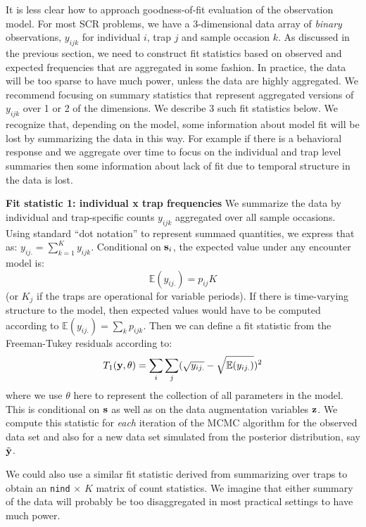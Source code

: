 It is less clear how to approach goodness-of-fit evaluation of the
observation model.  For most SCR problems, we have a 3-dimensional
data array of {\it binary} observations, $y_{ijk}$ for individual $i$,
trap $j$ and sample occasion $k$. As  discussed
in the previous section, we need to construct fit statistics based on
observed and expected frequencies that are aggregated in some fashion.
In practice, the data will be too sparse to have much power, unless
the 
data are highly aggregated. We recommend focusing on summary
statistics that represent aggregated versions of $y_{ijk}$ over 1 or 2
of the dimensions. We describe 3 such fit statistics below.  We
recognize that, depending on the model, some information about model
fit will be lost by summarizing the data in this way. For example if
there is a behavioral response and we aggregate over time to focus on
the individual and trap level summaries then some information about
lack of fit due to temporal structure in the data is lost.

{\bf Fit statistic 1: individual x trap frequencies} We summarize the
data by individual and trap-specific counts $y_{ijk}$
aggregated over
all sample occasions. Using standard ``dot notation'' to represent
summaed quantities, we express that as:
$y_{ij.} = \sum_{k=1}^{K} y_{ijk}$.
 Conditional on ${\bf s}_{i}$, the expected value
under any encounter model is:
\[
 \mathbb{E}(y_{ij.}) = p_{ij} K
\]
(or $K_{j}$ if the traps are operational for variable periods). If
there is time-varying structure to the model, then expected values
would have to be computed according to $\mathbb{E}(y_{ij.}) = \sum_{k} p_{ijk}$.
Then we can define a fit statistic from the Freeman-Tukey residuals
according to:
\[
 T_{1}({\bf y}, \theta) = \sum_{i}\sum_{j} (\sqrt{ y_{ij.} } - \sqrt{ \mathbb{E}(y_{ij.}) })^2
\]
where we use $\theta$ here to represent the collection of all
parameters in the model.  This is conditional on ${\bf s}$ as well as
on the data augmentation variables ${\bf z}$. We compute this
statistic for {\it each} iteration of the MCMC algorithm for the
observed data set and also for a new data set simulated from the posterior
distribution, say $\tilde{\bf y}$.

We could also use a similar fit statistic derived from summarizing
over traps to obtain an \mbox{\tt nind} $\times$ $K$ matrix of count
statistics.  We imagine that either summary of the data will probably
be too disaggregated in most practical settings to have much power.


